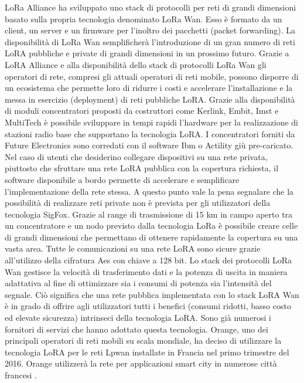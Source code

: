 \documentclass[a4paper]{report} %
\begin{document}
LoRa Alliance ha sviluppato uno stack di protocolli per reti di grandi dimensioni basato sulla propria tecnologia denominato LoRa Wan. Esso è formato da un client, un server e un firmware per l'inoltro dei pacchetti (packet forwarding). La disponibilità di LoRa Wan semplificherà l'introduzione di un gran numero di reti LoRA pubbliche e private di grandi dimensioni in un prossimo futuro. Grazie a LoRA Alliance e alla disponibilità dello stack di protocolli LoRa Wan gli operatori di rete, compresi gli attuali operatori di reti mobile, possono disporre di un ecosistema che permette loro di ridurre i costi e accelerare l'installazione e la messa in esercizio (deployment) di reti pubbliche LoRA. Grazie alla disponibilità di moduli concentratori proposti da costruttori come Kerlink, Embit, Imst e MultiTech è possibile sviluppare in tempi rapidi l'hardware per la realizzazione di stazioni radio base che supportano la tecnologia LoRA. I concentratori forniti da Future Electronics sono corredati con il software Ibm o Actility giù pre-caricato. Nel caso di utenti che desiderino collegare dispositivi su una rete privata, piuttosto che sfruttare una rete LoRA pubblica con la copertura richiesta, il software disponibile a bordo permette di accelerare e semplificare l'implementazione della rete stessa. A questo punto vale la pena segnalare che la possibilità di realizzare reti private non è prevista per gli utilizzatori della tecnologia SigFox. Grazie al range di trasmissione di 15 km in campo aperto tra un concentratore e un nodo previsto dalla tecnologia LoRa è possibile creare celle di grandi dimensioni che permettano di ottenere rapidamente la copertura su una vasta area. Tutte le comunicazioni su una rete LoRA sono sicure grazie all'utilizzo della cifratura Aes con chiave a 128 bit. Lo stack dei protocolli LoRa Wan gestisce la velocità di trasferimento dati e la potenza di uscita in maniera adattativa al fine di ottimizzare sia i consumi di potenza sia l'intensità del segnale. Ciò significa che una rete pubblica implementata con lo stack LoRA Wan è in grado di offrire agli utilizzatori tutti i benefici (consumi ridotti, basso costo ed elevate sicurezza) intrinseci della tecnologia LoRA. Sono già numerosi i fornitori di servizi che hanno adottato questa tecnologia. Orange, uno dei principali operatori di reti mobili su scala mondiale, ha deciso di utilizzare la tecnologia LoRA per le reti Lpwan installate in Francia nel primo trimestre del 2016. Orange utilizzerà la rete per applicazioni smart city in numerose città francesi \cite{art:rif.23}.
\end{document}
